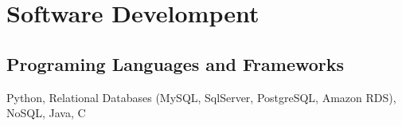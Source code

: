 \section{Software Develompent}


\subsection{Programing Languages and Frameworks}
Python,
Relational Databases (MySQL, SqlServer, PostgreSQL, Amazon RDS),
NoSQL,
Java,
C
